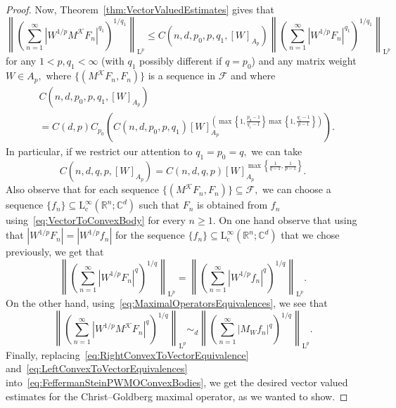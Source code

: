 \documentclass{article}
\theoremstyle{definition}
\theoremstyle{remark}
\numberwithin{equation}{section}
\newcommand{\norm}[2]{\left\|{#1}\right\|_{{#2}}}
\newcommand{\cF}{\mathcal{F}}
\newcommand{\cK}{\mathcal{K}}
\newcommand{\reals}{\mathbb{R}}
\newcommand{\complex}{\mathbb{C}}
\newcommand{\Lp}[1]{\mathrm{L}^{#1}}
\newcommand{\1}{\mathbf{1}}
\begin{document}
\begin{proof}
        Now, Theorem~\ref{thm:VectorValuedEstimates} gives that
        \begin{equation}
            \label{eq:FeffermanSteinPWMOConvexBodies}
            \norm{\left(\sum_{n=1}^\infty |W^{1/p} M^\cK F_n|^{q_1}\right)^{1/{q_1}}}{\Lp{p}}
            \leq C(n,d,p_0,p,q_1,[W]_{A_p}) \norm{\left(\sum_{n=1}^\infty |W^{1/p} F_n|^{q_1}\right)^{1/{q_1}}}{\Lp{p}}
        \end{equation}
        for any $1 < p,q_1 < \infty$ (with $q_1$ possibly different if $q = p_0$) and any matrix weight $W \in A_p,$
        where $\{(M^\cK F_n, F_n)\}$ is a sequence in $\cF$ and where
        \begin{align*}
            &C(n,d,p_0,p,q_1,[W]_{A_p})\\
            &= C(d,p) C_{p_0}\left(C(n,d,p_0,p,q_1) [W]_{A_p}^{\left(\max\left\{1,\frac{p_0-1}{q_1-1}\right\}\max\left\{1,\frac{q_1-1}{p-1}\right\}\right)}\right).
        \end{align*}
        In particular, if we restrict our attention to $q_1 = p_0 = q,$ we can take
        \begin{equation*}
            C(n,d,q,p,[W]_{A_p}) = C(n,d,q,p) [W]_{A_p}^{\max\left\{\frac{1}{q-1},\frac{1}{p-1}\right\}}.
        \end{equation*}
        Also observe that for each sequence $\{(M^\cK F_n, F_n)\} \subseteq \cF,$
        we can choose a sequence $\{f_n\} \subseteq \Lp{\infty}_\mathrm{c} (\reals^n; \complex^d)$ such that
        $F_n$ is obtained from $f_n$ using~\eqref{eq:VectorToConvexBody} for every $n \geq 1.$
        On one hand observe that using that $|W^{1/p} F_n| = |W^{1/p} f_n|$
        for the sequence $\{f_n\} \subseteq \Lp{\infty}_\mathrm{c} (\reals^n; \complex^d)$ that we chose previously,
        we get that
        \begin{equation}
            \label{eq:RightConvexToVectorEquivalence}
            \norm{\left(\sum_{n=1}^\infty |W^{1/p} F_n|^q\right)^{1/q}}{\Lp{p}}
            = \norm{\left(\sum_{n=1}^\infty |W^{1/p} f_n|^q\right)^{1/q}}{\Lp{p}}.
        \end{equation}
        On the other hand, using~\eqref{eq:MaximalOperatorsEquivalences}, we see that
        \begin{equation}
            \label{eq:LeftConvexToVectorEquivalences}
            \norm{\left(\sum_{n=1}^\infty |W^{1/p} M^\cK F_n|^q\right)^{1/q}}{\Lp{p}}
            \sim_{d} \norm{\left(\sum_{n=1}^\infty |M_W f_n|^q\right)^{1/q}}{\Lp{p}}.
        \end{equation}
        Finally, replacing~\eqref{eq:RightConvexToVectorEquivalence} and~\eqref{eq:LeftConvexToVectorEquivalences}
        into~\eqref{eq:FeffermanSteinPWMOConvexBodies}, we get the desired vector valued estimates
        for the Christ--Goldberg maximal operator, as we wanted to show.
    \end{proof}
    
\end{document}
